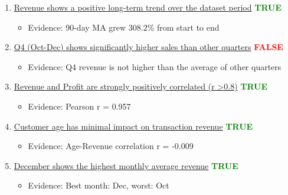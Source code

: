 \documentclass[11pt]{article}
\begin{document}
\begin{enumerate}[leftmargin=*]
    \item \underline{Revenue shows a positive long-term trend over the dataset period} \hspace*{\fill} \textcolor{green}{\textbf{TRUE}}
    \begin{itemize}[leftmargin=2em]
        \item Evidence: 90-day MA grew 308.2\% from start to end
    \end{itemize}
    
    \item \underline{Q4 (Oct-Dec) shows significantly higher sales than other quarters} \hspace*{\fill} \textcolor{red}{\textbf{FALSE}}
    \begin{itemize}[leftmargin=2em]
        \item Evidence: Q4 revenue is not higher than the average of other quarters
    \end{itemize}
    
    \item \underline{Revenue and Profit are strongly positively correlated (r \textgreater 0.8)} \hspace*{\fill} \textcolor{green}{\textbf{TRUE}}
    \begin{itemize}[leftmargin=2em]
        \item Evidence: Pearson r = 0.957
    \end{itemize}
    
    \item \underline{Customer age has minimal impact on transaction revenue} \hspace*{\fill} \textcolor{green}{\textbf{TRUE}}
    \begin{itemize}[leftmargin=2em]
        \item Evidence: Age-Revenue correlation r = -0.009
    \end{itemize}
    
    \item \underline{December shows the highest monthly average revenue} \hspace*{\fill} \textcolor{green}{\textbf{TRUE}}
    \begin{itemize}[leftmargin=2em]
        \item Evidence: Best month: Dec, worst: Oct
    \end{itemize}
\end{enumerate}
\end{document}
